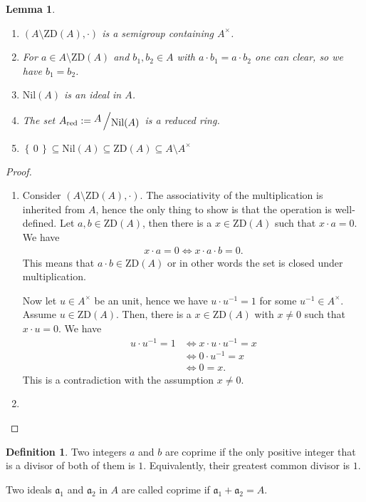 \documentclass{book}
\theoremstyle{plain}
\newtheorem{lmm}{Lemma}
\theoremstyle{definition}
\theoremstyle{custom_definition}
\newtheorem{defn}[thm]{Definition}
\newcommand{\set}[1]{\left\{\, #1 \,\right\}}
\newcommand{\bigslant}[2]{{\raisebox{.2em}{$#1$}\left/\raisebox{-.2em}{$#2$}\right.}}
\begin{document}
\begin{lmm}
    \begin{enumerate}
        \item \((A \setminus \text{ZD}(A), \cdot)\) is a semigroup containing \(A^\times\).
        \item For \(a \in A \setminus \text{ZD}(A)\) and \(b_1, b_2 \in A\) with \(a \cdot b_1 = a \cdot b_2\) one can clear, so we have \(b_1 = b_2\).
        \item \(\text{Nil}(A)\) is an ideal in \(A\).
        \item The set \(A_\text{red} := \bigslant{A}{\text{Nil}(A)}\) is a reduced ring.
        \item \(\set{0} \subseteq \text{Nil}(A) \subseteq \text{ZD}(A) \subseteq A \setminus A^\times\)
    \end{enumerate}
\end{lmm}
\begin{proof}
    \begin{enumerate}
        \item Consider \((A \setminus \text{ZD}(A), \cdot)\). The associativity of the multiplication is inherited from \(A\), hence the only thing to show is that the operation is well-defined. Let \(a, b \in \text{ZD}(A)\), then there is a \(x \in \text{ZD}(A)\) such that \(x \cdot a = 0\). We have
        \begin{align}
            x \cdot a = 0 \iff x \cdot a \cdot b = 0 \text{.}
        \end{align}
        This means that \(a \cdot b \in \text{ZD}(A)\) or in other words the set is closed under multiplication.

        Now let \(u \in A^\times\) be an unit, hence we have \(u \cdot u^{-1} = 1\) for some \(u^{-1} \in A^\times\). Assume \(u \in \text{ZD}(A)\). Then, there is a \(x \in \text{ZD}(A)\) with \(x \neq 0\) such that \(x \cdot u = 0\). We have
        \begin{align}
            u \cdot u^{-1} = 1 &\iff x \cdot u \cdot u^{-1} = x \\
            &\iff 0 \cdot u^{-1} = x \\
            &\iff 0 = x \text{.}
        \end{align}
        This is a contradiction with the assumption \(x \neq 0\).
        \item
    \end{enumerate}
\end{proof}

\begin{defn}
    Two integers \(a\) and \(b\) are coprime if the only positive integer that is a divisor of both of them is \(1\). Equivalently, their greatest common divisor is \(1\).

    Two ideals \(\mathfrak{a}_1\) and \(\mathfrak{a}_2\) in \(A\) are called coprime if \(\mathfrak{a}_1 + \mathfrak{a}_2 = A\).
\end{defn}
\end{document}
